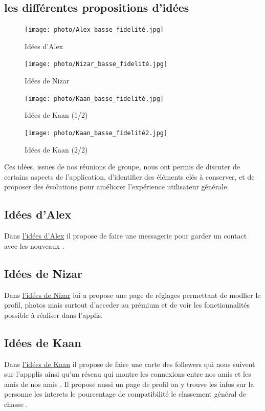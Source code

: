 \documentclass{article}
\begin{document}
\subsection{les différentes propositions d'idées}
\begin{figure}[H]
    \centering
    \begin{minipage}{0.4\textwidth}
        \centering
        \texttt{[image: photo/Alex\_basse\_fidelité.jpg]}
        \caption{Idées d'Alex}
        \label{fig:Alex}
    \end{minipage}
    \hfill
    \begin{minipage}{0.4\textwidth}
        \centering
        \texttt{[image: photo/Nizar\_basse\_fidelité.jpg]}
        \caption{Idées de Nizar}
        \label{fig:Nizar}
    \end{minipage}
    \begin{minipage}{0.4\textwidth}
        \centering
        \texttt{[image: photo/Kaan\_basse\_fidelité.jpg]}
        \caption{Idées de Kaan (1/2)}
    \end{minipage}
    \hfill
    \begin{minipage}{0.4\textwidth}
        \centering
        \texttt{[image: photo/Kaan\_basse\_fidelité2.jpg]}
        \caption{Idées de Kaan (2/2)}
        \label{fig:Kaan}
    \end{minipage}
\end{figure}

Ces idées, issues de nos réunions de groupe, nous ont permis de discuter de certains aspects
 de l'application, d'identifier des éléments clés à conserver, 
et de proposer des évolutions pour améliorer l'expérience utilisateur générale. \\

\subsection{Idées d'Alex}
Dans \hyperref[fig:Alex]{l'idées d'Alex} il propose  de faire une messagerie pour garder
 un contact avec les nouveaux .

\subsection{Idées de Nizar}
Dans \hyperref[fig:Nizar]{l'idées de Nizar} lui a propose une page de réglages permettant de modfier le profil, photos mais surtout
d'acceder au prémium et de voir les fonctionnalités possible à réaliser dans l'applis.

\subsection{Idées de Kaan}
Dans \hyperref [fig:Kaan]{l'idées de Kaan} il propose de faire une carte des follewers qui nous suivent sur l'appplis ainsi qu'un
réseau qui montre les connexions entre nos amis et les amis de nos amis . Il propose aussi un page de profil on y trouve 
les infos sur la personne les interets le pourcentage de compatibilité  le classement général de chasse . 
\end{document}
